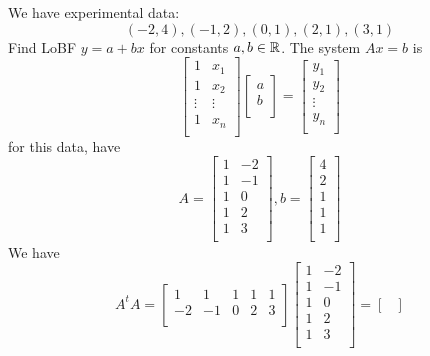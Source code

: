 \documentclass{article}
\begin{document}
\begin{example}
  We have experimental data:
  \[
    (-2, 4), (-1, 2), (0, 1), (2, 1), (3, 1)
  \]
  Find LoBF $y = a + bx$ for constants $a, b \in \mathbb{R}$. The system $Ax = b$ is \[
    \begin{bmatrix}
      1      & x_1    \\
      1      & x_2    \\
      \vdots & \vdots \\
      1      & x_n    \\
    \end{bmatrix}
    \begin{bmatrix}
      a \\b\\
    \end{bmatrix} =
    \begin{bmatrix}
      y_1 \\y_2\\\vdots\\y_n\\
    \end{bmatrix}
  \]
  for this data, have \[
    A =
    \begin{bmatrix}
      1 & -2 \\
      1 & -1 \\
      1 & 0  \\
      1 & 2  \\
      1 & 3  \\
    \end{bmatrix}, b =
    \begin{bmatrix}
      4 \\2\\1\\1\\1\\
    \end{bmatrix}
  \]
  We have \[
    A^tA =
    \begin{bmatrix}
      1  & 1  & 1 & 1 & 1 \\
      -2 & -1 & 0 & 2 & 3 \\
    \end{bmatrix}
    \begin{bmatrix}
      1 & -2 \\
      1 & -1 \\
      1 & 0  \\
      1 & 2  \\
      1 & 3  \\
    \end{bmatrix} =
    \begin{bmatrix}

\end{bmatrix}\]
\end{example}
\end{document}
